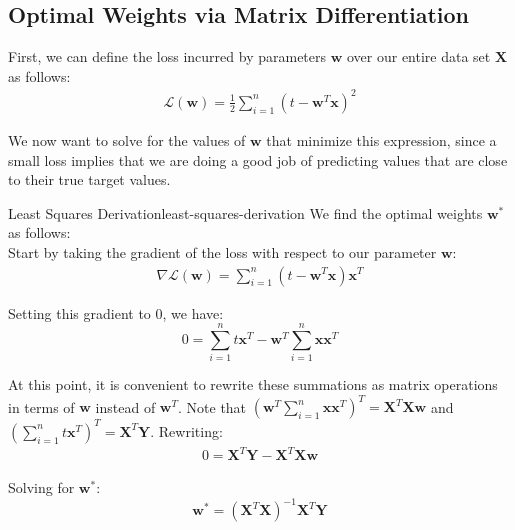 \subsection{Optimal Weights via Matrix Differentiation}
First, we can define the loss incurred by parameters $\textbf{w}$ over our entire data set $\textbf{X}$ as follows:
\begin{align}
    \mathcal{L}(\textbf{w}) = \frac{1}{2} \sum_{i=1}^{n} (t - \textbf{w}^{T}\textbf{x})^2
\end{align}


We now want to solve for the values of $\textbf{w}$ that minimize this expression, since a small loss implies that we are doing a good job of predicting values that are close to their true target values.

\begin{derivation}{Least Squares Derivation}{least-squares-derivation}
    We find the optimal weights $\textbf{w}^{*}$ as follows: \\

    Start by taking the gradient of the loss with respect to our parameter $\textbf{w}$:
    \begin{align*}
        \nabla \mathcal{L}(\textbf{w}) = \sum_{i=1}^{n} (t - \textbf{w}^{T}\textbf{x})\textbf{x}^{T}
    \end{align*}

    Setting this gradient to 0, we have:
    \begin{equation} \label{least-squares-solving-for-w}
        0 = \sum_{i=1}^{n} t \textbf{x}^{T} - \textbf{w}^{T} \sum_{i=1}^{n} \textbf{x}\textbf{x}^{T}
    \end{equation}

    At this point, it is convenient to rewrite these summations as matrix operations in terms of $\textbf{w}$ instead of $\textbf{w}^{T}$. Note that $(\textbf{w}^{T} \sum_{i=1}^{n} \textbf{x}\textbf{x}^{T})^{T} = \textbf{X}^{T}\textbf{X}\textbf{w}$ and $(\sum_{i=1}^{n} t \textbf{x}^{T})^{T} = \textbf{X}^{T}\textbf{Y}$. Rewriting:
    \begin{align*}
        0 = \textbf{X}^{T}\textbf{Y} - \textbf{X}^{T}\textbf{X}\textbf{w}
    \end{align*}

    Solving for $\textbf{w}^{*}$:
    \begin{equation} \label{least-squares-solved-for-w}
        \textbf{w}^{*} = (\textbf{X}^{T}\textbf{X})^{-1}\textbf{X}^{T}\textbf{Y}
    \end{equation}
\end{derivation}

